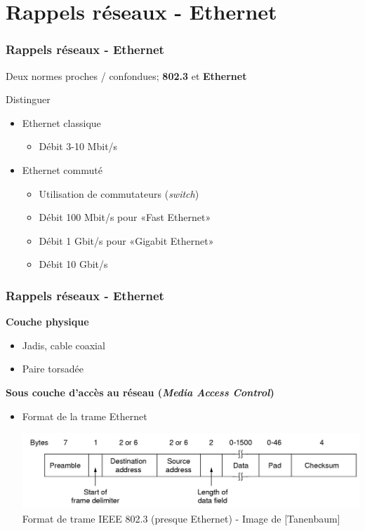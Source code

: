 \section{Rappels réseaux - Ethernet}

\begin{frame}[fragile]
  \frametitle{Rappels réseaux - Ethernet}
Deux normes proches / confondues; \textbf{802.3} et \textbf{Ethernet}

Distinguer
\begin{itemize}
	\item Ethernet classique
	\begin{itemize}
		\item Débit 3-10 Mbit/s
	\end{itemize}
	\item Ethernet commuté
	\begin{itemize}
		\item Utilisation de commutateurs (\textit{switch})
		\item Débit 100 Mbit/s pour «Fast Ethernet»
		\item Débit 1 Gbit/s pour «Gigabit Ethernet»
		\item Débit 10 Gbit/s
	\end{itemize}
\end{itemize}
\end{frame}

\begin{frame}[fragile]
  \frametitle{Rappels réseaux - Ethernet}
{\large\bf Couche physique}
\begin{itemize}
	\item Jadis, cable coaxial
	\item Paire torsadée
\end{itemize}

{\large\bf Sous couche d'accès au réseau (\textit{Media Access Control})}
\begin{itemize}
	\item Format de la trame Ethernet \\
	\begin{center}
		\includegraphics[width=.90\linewidth]{img/4-21.jpg} \\
		{\scriptsize Format de trame IEEE 802.3 (presque Ethernet) - Image de
		[Tanenbaum]}
	\end{center}
\end{itemize}
\end{frame}

